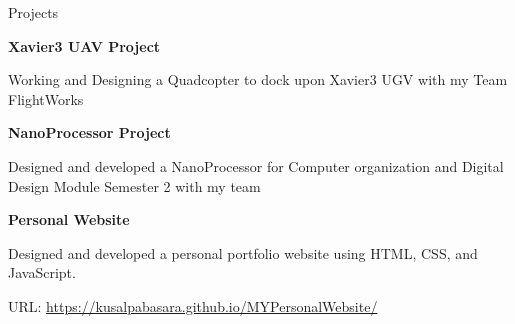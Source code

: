 \begin{rubric}{Projects}

\entry*[2023]%
    \textbf{Xavier3 UAV Project}
    \par Working and Designing a Quadcopter to dock upon Xavier3 UGV with my Team FlightWorks
    
    \textbf{NanoProcessor Project}
    \par Designed and developed a NanoProcessor for Computer organization and Digital Design Module Semester 2 with my team
    
    \textbf{Personal Website}
    \par Designed and developed a personal portfolio website using HTML, CSS, and JavaScript.
    \par URL: \href{https://kusalpabasara.github.io/MYPersonalWebsite/}{https://kusalpabasara.github.io/MYPersonalWebsite/}


\end{rubric}